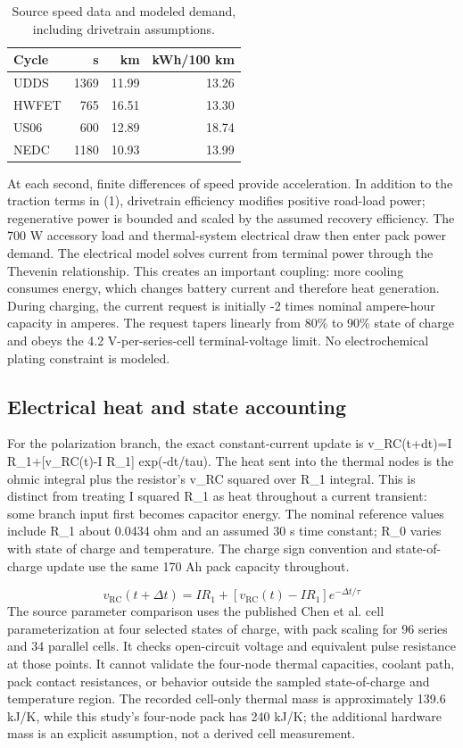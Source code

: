 \documentclass[conference]{IEEEtran}
\begin{document}
\begin{table}[t]
\caption{Source speed data and modeled demand, including drivetrain assumptions.}
\label{tab:VI}
\centering\footnotesize
\begin{tabular}{lrrr}
\toprule
Cycle & s & km & kWh/100 km\\
\midrule
UDDS & 1369 & 11.99 & 13.26\\
HWFET & 765 & 16.51 & 13.30\\
US06 & 600 & 12.89 & 18.74\\
NEDC & 1180 & 10.93 & 13.99\\
\bottomrule
\end{tabular}
\end{table}
At each second, finite differences of speed provide acceleration. In addition to the traction terms in (1), drivetrain efficiency modifies positive road-load power; regenerative power is bounded and scaled by the assumed recovery efficiency. The 700 W accessory load and thermal-system electrical draw then enter pack power demand. The electrical model solves current from terminal power through the Thevenin relationship. This creates an important coupling: more cooling consumes energy, which changes battery current and therefore heat generation. During charging, the current request is initially -2 times nominal ampere-hour capacity in amperes. The request tapers linearly from 80\% to 90\% state of charge and obeys the 4.2 V-per-series-cell terminal-voltage limit. No electrochemical plating constraint is modeled.

\subsection{Electrical heat and state accounting}
For the polarization branch, the exact constant-current update is v\_RC(t+dt)=I R\_1+[v\_RC(t)-I R\_1] exp(-dt/tau). The heat sent into the thermal nodes is the ohmic integral plus the resistor's v\_RC squared over R\_1 integral. This is distinct from treating I squared R\_1 as heat throughout a current transient: some branch input first becomes capacitor energy. The nominal reference values include R\_1 about 0.0434 ohm and an assumed 30 s time constant; R\_0 varies with state of charge and temperature. The charge sign convention and state-of-charge update use the same 170 Ah pack capacity throughout.

\begin{equation}
v_{\mathrm{RC}}(t+\Delta t)=IR_1+[v_{\mathrm{RC}}(t)-IR_1]e^{-\Delta t/\tau}
\label{eq:4}
\end{equation}
The source parameter comparison uses the published Chen et al. cell parameterization at four selected states of charge, with pack scaling for 96 series and 34 parallel cells. It checks open-circuit voltage and equivalent pulse resistance at those points. It cannot validate the four-node thermal capacities, coolant path, pack contact resistances, or behavior outside the sampled state-of-charge and temperature region. The recorded cell-only thermal mass is approximately 139.6 kJ/K, while this study's four-node pack has 240 kJ/K; the additional hardware mass is an explicit assumption, not a derived cell measurement.
\end{document}

